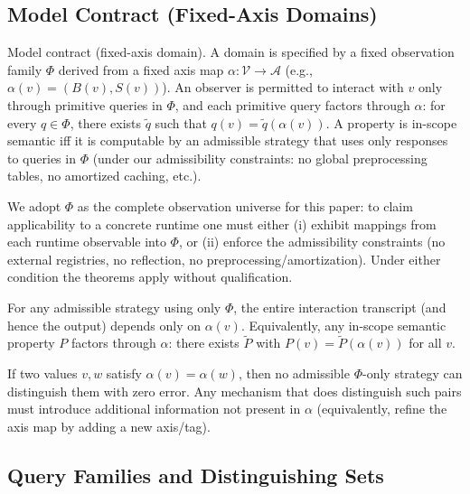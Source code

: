 \subsection{Model Contract (Fixed-Axis Domains)}

Model contract (fixed-axis domain). A domain is specified by a fixed observation family $\Phi$ derived from a fixed axis map $\alpha: \mathcal{V} \to \mathcal{A}$ (e.g., $\alpha(v) = (B(v), S(v))$). An observer is permitted to interact with $v$ only through primitive queries in $\Phi$, and each primitive query factors through $\alpha$: for every $q \in \Phi$, there exists $\tilde{q}$ such that $q(v) = \tilde{q}(\alpha(v))$.
A property is in-scope semantic iff it is computable by an admissible strategy that uses only responses to queries in $\Phi$ (under our admissibility constraints: no global preprocessing tables, no amortized caching, etc.).

We adopt $\Phi$ as the complete observation universe for this paper: to claim applicability to a concrete runtime one must either (i) exhibit mappings from each runtime observable into $\Phi$, or (ii) enforce the admissibility constraints (no external registries, no reflection, no preprocessing/amortization). Under either condition the theorems apply without qualification.

\begin{proposition}\label{prop:observational-quotient}
For any admissible strategy using only $\Phi$, the entire interaction transcript (and hence the output) depends only on $\alpha(v)$. Equivalently, any in-scope semantic property $P$ factors through $\alpha$: there exists $\tilde{P}$ with $P(v) = \tilde{P}(\alpha(v))$ for all $v$.
\end{proposition}

\begin{corollary}[Why ``ad hoc'' = adding an axis/tag]\label{cor:ad-hoc-add-axis}
If two values $v, w$ satisfy $\alpha(v) = \alpha(w)$, then no admissible $\Phi$-only strategy can distinguish them with zero error. Any mechanism that does distinguish such pairs must introduce additional information not present in $\alpha$ (equivalently, refine the axis map by adding a new axis/tag).
\end{corollary}

\subsection{Query Families and Distinguishing Sets}

